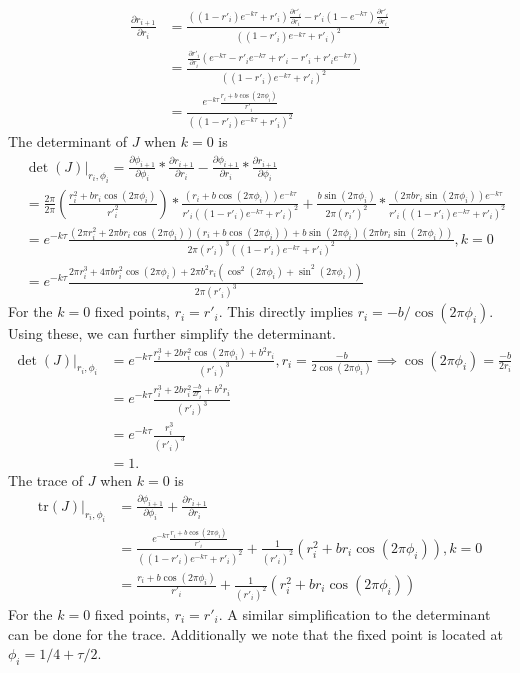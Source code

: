 \begin{align*}
   \frac{\partial r_{i+1}}{\partial r_i} & = \frac{((1-r'_i)e^{-k\tau}+r'_i)\frac{\partial r'_i}{\partial r_i}-r'_i(1-e^{-k\tau})\frac{\partial r'_i}{\partial r_i}}{((1-r'_i)e^{-k\tau}+r'_i)^2}\\
    & = \frac{\frac{\partial r'_i}{\partial r_i}(e^{-k\tau}-r'_ie^{-k\tau}+r'_i-r'_i+r'_ie^{-k\tau})}{((1-r'_i)e^{-k\tau}+r'_i)^2}\\
    & = \frac{e^{-k\tau}\frac{r_i+b\cos(2\pi\phi_i)}{r'_i}}{((1-r'_i)e^{-k\tau}+r'_i)^2}
\end{align*}
The determinant of $J$ when $k=0$ is
\begin{align}
    &\det(J)|_{r_i,\phi_i}= 
     \frac{\partial \phi_{i+1}}{\partial \phi_i}*\frac{\partial r_{i+1}}{\partial r_i}-\frac{\partial \phi_{i+1}}{\partial r_i}*  \frac{\partial r_{i+1}}{\partial \phi_i} \nonumber \\
     &=\frac{2\pi}{2\pi}(\frac{r_i^2+br_i\cos(2\pi\phi_i)}{r'_i^2})*\frac{(r_i+b\cos(2\pi\phi_i))e^{-k\tau}}{r'_i((1-r'_i)e^{-k\tau}+r'_i)^2} + \frac{b \sin(2\pi \phi_i)}{2\pi(r_i')^2}*\frac{(2\pi b r_i \sin(2\pi\phi_i))e^{-k\tau}}{r'_i((1-r'_i)e^{-k\tau}+r'_i)^2} \nonumber \\
    & = e^{-k\tau}\frac{(2\pi r_i^2+2\pi br_i\cos(2\pi\phi_i))(r_i+b\cos(2\pi\phi_i))+b\sin(2\pi\phi_i)(2\pi br_i\sin(2\pi\phi_i))}{2\pi (r'_i)^3((1-r'_i)e^{-k\tau}+r'_i)^2}, k=0 \nonumber \\
    & = e^{-k\tau}\frac{2\pi r_i^3+4\pi br_i^2\cos(2\pi\phi_i)+2\pi b^2r_i(\cos^2(2\pi\phi_i)+\sin^2(2\pi\phi_i))}{2\pi (r'_i)^3} \nonumber
\end{align}
For the $k=0$ fixed points, $r_i=r'_i$. This directly implies $r_i = -b/\cos(2\pi\phi_i)$. Using these, we can further simplify the determinant.
\begin{align}
    \det(J)|_{r_i,\phi_i} & = e^{-k\tau}\frac{r_i^3+2 br_i^2\cos(2\pi\phi_i)+ b^2r_i}{(r'_i)^3}, r_i = \frac{-b}{2\cos(2\pi\phi_i)} \implies \cos(2\pi\phi_i) = \frac{-b}{2r_i} \nonumber \\
    & = e^{-k\tau}\frac{r_i^3+2 br_i^2\frac{-b}{2r_i}+ b^2r_i}{(r'_i)^3} \nonumber \\
    & = e^{-k\tau}\frac{r_i^3}{(r'_i)^3}\\ \label{eq: det k}
    & = 1.
\end{align}
The trace of $J$ when $k=0$ is
\begin{align*}
    \text{tr}(J)|_{r_i,\phi_i} & = \frac{\partial \phi_{i+1}}{\partial \phi_i}+\frac{\partial r_{i+1}}{\partial r_i}\\
    & = \frac{e^{-k\tau}\frac{r_i+b\cos(2\pi\phi_i)}{r'_i}}{((1-r'_i)e^{-k\tau}+r'_i)^2}+\frac{1}{(r'_i)^2}(r_i^2+br_i\cos(2\pi\phi_i)), k=0\\
    &=\frac{r_i+b\cos(2\pi\phi_i)}{r'_i}+\frac{1}{(r'_i)^2}(r_i^2+br_i\cos(2\pi\phi_i))
\end{align*} For the $k=0$ fixed points, $r_i=r'_i$. A similar simplification to the determinant can be done for the trace. Additionally we note that the fixed point is located at $\phi_i = 1/4+\tau/2$.
